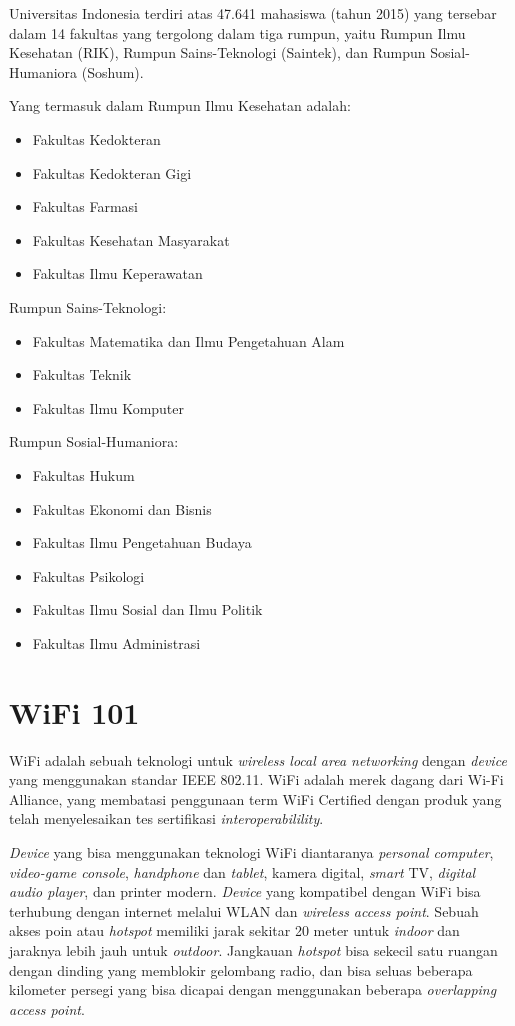 Universitas Indonesia terdiri atas 47.641 mahasiswa (tahun 2015) yang tersebar dalam 14 fakultas yang tergolong dalam tiga rumpun, yaitu Rumpun Ilmu Kesehatan (RIK), Rumpun Sains-Teknologi (Saintek), dan Rumpun Sosial-Humaniora (Soshum). \cite{ui.wiki}

Yang termasuk dalam Rumpun Ilmu Kesehatan adalah:
\begin{itemize}
 \item Fakultas Kedokteran
 \item Fakultas Kedokteran Gigi
 \item Fakultas Farmasi
 \item Fakultas Kesehatan Masyarakat
 \item Fakultas Ilmu Keperawatan
\end{itemize}

Rumpun Sains-Teknologi:
\begin{itemize}
\item Fakultas Matematika dan Ilmu Pengetahuan Alam
\item Fakultas Teknik
\item Fakultas Ilmu Komputer
\end{itemize}

Rumpun Sosial-Humaniora:
\begin{itemize}
\item Fakultas Hukum
\item Fakultas Ekonomi dan Bisnis
\item Fakultas Ilmu Pengetahuan Budaya
\item Fakultas Psikologi
\item Fakultas Ilmu Sosial dan Ilmu Politik
\item Fakultas Ilmu Administrasi
\end{itemize}

\section{WiFi 101}

WiFi adalah sebuah teknologi untuk \textit{wireless local area networking} dengan \textit{device} yang menggunakan standar IEEE 802.11. WiFi adalah merek dagang dari Wi-Fi Alliance, yang membatasi penggunaan term WiFi Certified dengan produk yang telah menyelesaikan tes sertifikasi \textit{interoperabilility}. \cite{wifi}

\textit{Device} yang bisa menggunakan teknologi WiFi diantaranya \textit{personal computer}, \textit{video-game console}, \textit{handphone} dan \textit{tablet}, kamera digital, \textit{smart} TV, \textit{digital audio player}, dan printer modern. \textit{Device} yang kompatibel dengan WiFi bisa terhubung dengan internet melalui WLAN dan \textit{wireless access point}. Sebuah akses poin atau \textit{hotspot} memiliki jarak sekitar 20 meter untuk \textit{indoor} dan jaraknya lebih jauh untuk \textit{outdoor}. Jangkauan \textit{hotspot} bisa sekecil satu ruangan dengan dinding yang memblokir gelombang radio, dan bisa seluas beberapa kilometer persegi yang bisa dicapai dengan menggunakan beberapa \textit{overlapping access point}.


